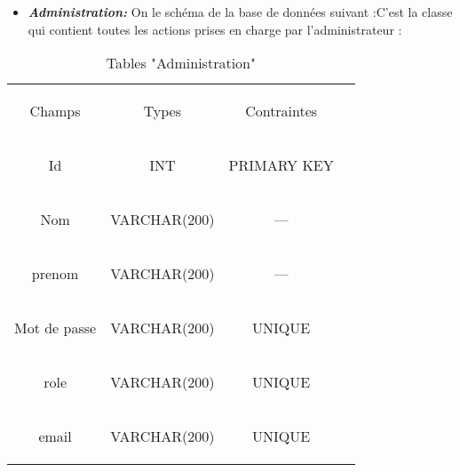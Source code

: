 \smallskip
\smallskip
\smallskip
\begin{table}[h]
	
	\begin{itemize}
		
		\item \textit{\textbf{ Administration:}} On  le schéma de la base
		de données suivant :C'est la classe qui contient toutes les actions prises en charge
		par l'administrateur : 
	\end{itemize}
	\begin{center}
		\begin{tabular}{>{\begin{bf} } c <{\end{bf}}ccc}
			
			\rowcolor{-blue!20!red}Champs & \begin{bf}Types \end{bf} & \begin{bf}Contraintes\end{bf} & \\
			
			Id & INT & PRIMARY KEY& \\
			
			Nom &VARCHAR(200) & --- &\\
			prenom &VARCHAR(200) & --- &\\
			Mot de passe & VARCHAR(200)  & UNIQUE& \\
			
			role & VARCHAR(200) & UNIQUE  &\\
			email& VARCHAR(200)& UNIQUE &\\

		
			
		\end{tabular}
	\end{center}
	\caption{Tables  "Administration"}
	\label{mes belles tables}
\end{table}


